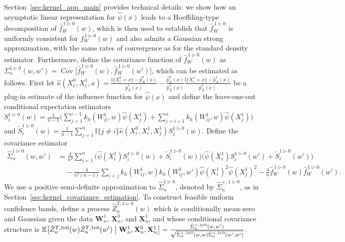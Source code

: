 \documentclass[11pt,lof]{puthesis}
\newcommand{\E}{\ensuremath{\mathbb{E}}}
\newcommand{\I}{\ensuremath{\mathbb{I}}}
\newcommand{\bW}{\ensuremath{\mathbf{W}}}
\newcommand{\bX}{\ensuremath{\mathbf{X}}}
\DeclareMathOperator{\Cov}{Cov}
\theoremstyle{break}
\theoremstyle{proof}
\begin{document}
Section~\ref{sec:kernel_app_main} provides technical details:
we show how an asymptotic linear representation for $\hat\psi(x)$ leads to a
Hoeffding-type decomposition of $\hat f_W^{\,1 \triangleright 0}(w)$,
which is then used to establish that $\hat f_W^{\,1 \triangleright 0}$
is uniformly consistent for $f_W^{\,1 \triangleright 0}(w)$
and also admits a Gaussian strong approximation, with the same rates of
convergence as for the standard density estimator. Furthermore, define the
covariance function of $\hat f_W^{\,1 \triangleright 0}(w)$ as
$\Sigma_n^{1 \triangleright 0}(w,w') = \Cov\big[
\hat f_W^{\,1 \triangleright 0}(w),
\hat f_W^{\,1 \triangleright 0}(w') \big]$,
which can be estimated as follows. First let
$\hat\kappa(X_i^0, X_i^1, x)
= \frac{\I\{X_i^0 = x\} - \hat p_X^0(x)}{\hat p_X^1(x)}
- \frac{\hat p_X^0(x)}{\hat p_X^1(x)} \frac{\I\{X_i^1 = x\} - \hat
p_X^1(x)}{\hat p_X^1(x)}$
be a plug-in estimate of the influence function for $\hat\psi(x)$
and define the leave-one-out conditional expectation estimators
$S_i^{1 \triangleright 0}(w)
= \frac{1}{n-1} \big( \sum_{j=1}^{i-1} k_h(W_{j i}^1,w) \hat\psi(X_j^1)
+ \sum_{j=i+1}^n k_h(W_{i j}^1,w) \hat\psi(X_j^1) \big)$
and $\tilde S_i^{1 \triangleright 0}(w)
= \frac{1}{n-1} \sum_{j=1}^n \I\{j \neq i\}
\hat\kappa(X_i^0, X_i^1, X_j^1) S_j^{1 \triangleright 0}(w)$.
Define the covariance estimator
%
\begin{align*}
\hat\Sigma_n^{1 \triangleright 0}(w,w')
&= \frac{4}{n^2} \sum_{i=1}^n
\big(
\hat\psi(X_i^1) S_i^{1 \triangleright 0}(w)
+ \tilde S_i^{1 \triangleright 0}(w)
\big)
\big(
\hat\psi(X_i^1) S_i^{1 \triangleright 0}(w')
+ \tilde S_i^{1 \triangleright 0}(w')
\big) \\
&\quad-
\frac{4}{n^3(n-1)}
\sum_{i<j} k_h(W_{i j}^1, w) k_h(W_{i j}^1, w')
\hat\psi(X_i^1)^2 \hat\psi(X_j^1)^2
- \frac{4}{n}
\hat f_W^{\,1 \triangleright 0}(w) \hat f_W^{\,1 \triangleright 0}(w').
\end{align*}
%
We use a positive semi-definite approximation to
$\hat\Sigma_n^{1 \triangleright 0}$, denoted by
$\hat\Sigma_n^{+, 1 \triangleright 0}$,
as in Section~\ref{sec:kernel_covariance_estimation}. To construct feasible
uniform
confidence bands, define a process $\hat Z_n^{T, 1 \triangleright 0}(w)$ which
is conditionally mean-zero and Gaussian given the data $\bW_n^1$, $\bX_n^0$, and
$\bX_n^1$, and whose conditional covariance structure is
$\E\big[\hat Z_n^{T, 1 \triangleright 0}(w)
\hat Z_n^{T, 1 \triangleright 0}(w')
\bigm| \bW_n^1, \bX_n^0, \bX_n^1 \big]
= \frac{\hat \Sigma_n^{+, 1 \triangleright 0}(w,w')}
{\sqrt{\hat \Sigma_n^{+, 1 \triangleright 0}(w,w)
\hat \Sigma_n^{+, 1 \triangleright 0}(w',w')}}$.
\end{document}
